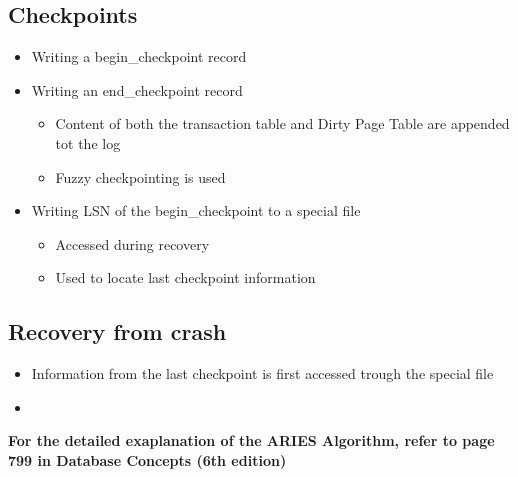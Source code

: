 \subsection{Checkpoints}
\begin{itemize}
	\item Writing a begin\_checkpoint record
	\item Writing an end\_checkpoint record
	\begin{itemize}
		\item Content of both the transaction table and Dirty Page Table are appended tot the log
		\item Fuzzy checkpointing is used
	\end{itemize}
	\item Writing LSN of the begin\_checkpoint to a special file
	\begin{itemize}
		\item Accessed during recovery
		\item Used to locate last checkpoint information
	\end{itemize}
\end{itemize}

\subsection{Recovery from crash}
\begin{itemize}
	\item Information from the last checkpoint is first accessed trough the special file 
	\item 
\end{itemize}

\textbf{For the detailed exaplanation of the ARIES Algorithm, refer to page 799 in Database Concepts (6th edition)}

